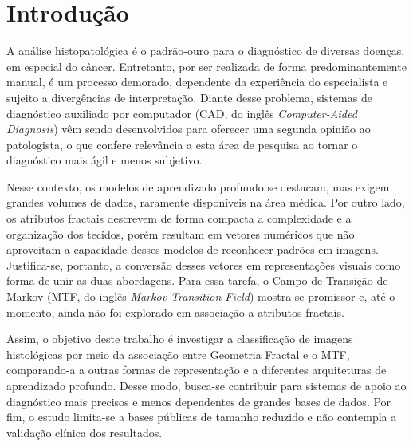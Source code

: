 \chapter{Introdução} %

A análise histopatológica é o padrão-ouro para o diagnóstico de diversas doenças, em especial do câncer. Entretanto, por ser realizada de forma predominantemente manual, é um processo demorado, dependente da experiência do especialista e sujeito a divergências de interpretação. Diante desse problema, sistemas de diagnóstico auxiliado por computador (CAD, do inglês \textit{Computer-Aided Diagnosis}) vêm sendo desenvolvidos para oferecer uma segunda opinião ao patologista, o que confere relevância a esta área de pesquisa ao tornar o diagnóstico mais ágil e menos subjetivo.

Nesse contexto, os modelos de aprendizado profundo se destacam, mas exigem grandes volumes de dados, raramente disponíveis na área médica. Por outro lado, os atributos fractais descrevem de forma compacta a complexidade e a organização dos tecidos, porém resultam em vetores numéricos que não aproveitam a capacidade desses modelos de reconhecer padrões em imagens. Justifica-se, portanto, a conversão desses vetores em representações visuais como forma de unir as duas abordagens. Para essa tarefa, o Campo de Transição de Markov (MTF, do inglês \textit{Markov Transition Field}) mostra-se promissor e, até o momento, ainda não foi explorado em associação a atributos fractais.

Assim, o objetivo deste trabalho é investigar a classificação de imagens histológicas por meio da associação entre Geometria Fractal e o MTF, comparando-a a outras formas de representação e a diferentes arquiteturas de aprendizado profundo. Desse modo, busca-se contribuir para sistemas de apoio ao diagnóstico mais precisos e menos dependentes de grandes bases de dados. Por fim, o estudo limita-se a bases públicas de tamanho reduzido e não contempla a validação clínica dos resultados.
